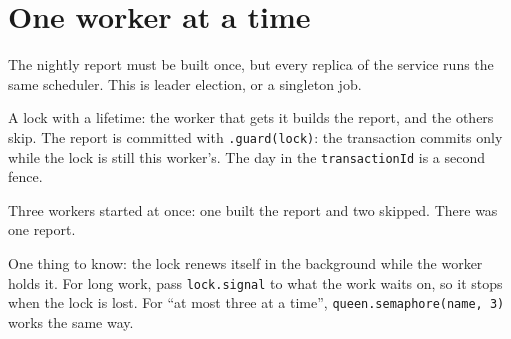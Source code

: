 %

\section{One worker at a time}

The nightly report must be built once, but every replica of the service runs the same scheduler.
This is leader election, or a singleton job.

A lock with a lifetime: the worker that gets it builds the report, and the others skip. The report
is committed with \texttt{.guard(lock)}: the transaction commits only while the lock is still this
worker's. The day in the \texttt{transactionId} is a second fence.



Three workers started at once: one built the report and two skipped. There was one report.


One thing to know: the lock renews itself in the background while the worker holds it. For long
work, pass \texttt{lock.signal} to what the work waits on, so it stops when the lock is lost. For
``at most three at a time'', \texttt{queen.semaphore(name, 3)} works the same way.
